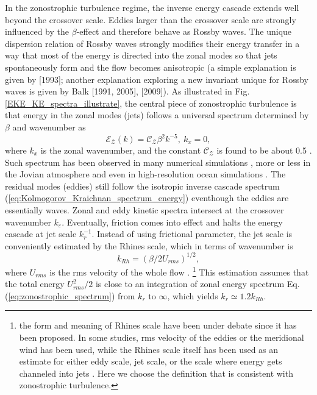 \documentclass{ametsoc}
\begin{document}
In the zonostrophic turbulence regime, the inverse energy cascade extends well beyond 
the crossover scale. Eddies larger than the crossover scale 
are strongly influenced by the $\beta$-effect and therefore behave
as Rossby waves. The unique dispersion relation of Rossby waves strongly
modifies their energy transfer in a way that most of the energy is
directed into the zonal modes so that jets spontaneously form and
the flow becomes anisotropic (a simple explanation is given by \citeauthor{Vallis1993}
{[}1993{]}; another explanation exploring a new invariant unique for
Rossby waves is given by \nocite{Balk1991,Balk2005}Balk {[}1991,
2005{]}, \citeauthor{Nazarenko2009} {[}2009{]}). As illustrated in Fig. \ref{EKE_KE_spectra_illustrate}, 
the central piece of zonostrophic turbulence is that 
energy in the zonal modes (jets) follows a universal spectrum determined
by $\beta$ and wavenumber as
\begin{equation}
\mathcal{E_{Z}}(k)=\mathcal{C_{Z}}\beta^{2}k^{-5},\ k_{x}=0,\label{eq:zonostrophic_spectrum}
\end{equation}
where $k_{x}$ is the zonal wavenumber, and the constant $\mathcal{C_{Z}}$
is found to be about 0.5 \citep{Sukoriansky2002,Smith2002,Galperin2010}.
Such spectrum has been observed in many numerical simulations \citep{Chekhlov1996,Smith2002,Huang2001,Sukoriansky2002,Sukoriansky2007},
more or less in the Jovian atmosphere \citep{Sukoriansky2002,Choi2011,Galperin2014}
and even in high-resolution ocean simulations \citep{Galperin2004}.
The residual modes (eddies) still follow the isotropic inverse cascade
spectrum (\ref{eq:Kolmogorov_Kraichnan_spectrum_energy}) eventhough the eddies are essentially waves. 
Zonal and eddy kinetic spectra intersect at the crossover wavenumber $k_{\varepsilon}$.
Eventually, friction comes into effect and halts the energy cascade at jet scale $k_r^{-1}$.
Instead of using frictional parameter, the jet scale is conveniently estimated by 
the Rhines scale, which in terms of wavenumber is
\begin{equation}
    k_{Rh}=(\beta/2U_{rms})^{1/2},\label{eq:Rhines_wavenumber_beta_Urms}
\end{equation}
where $U_{rms}$ is the rms velocity of the whole flow \citep{Rhines1975}.
\footnote{the form and meaning of Rhines scale have been
under debate since it has been proposed. In some studies, rms velocity
of the eddies or the meridional wind has been used, while the Rhines scale itself
has been used as an estimate for either eddy scale, jet scale, or
the scale where energy gets channeled into jets \citep{Williams1978,Jansen2012,Chai2014,Liu2015,Chemke2015}.
Here we choose the definition that is consistent with zonostrophic turbulence.} This estimation
assumes that the total energy $U_{rms}^{2}/2$ is close to an integration of zonal energy spectrum
Eq. (\ref{eq:zonostrophic_spectrum}) from $k_{r}$ to $\infty$, which yields $k_{r}\simeq1.2k_{Rh}$.
\end{document}
